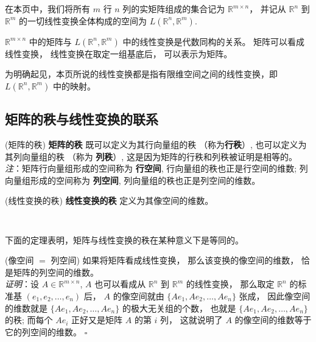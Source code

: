 

在本页中，我们将所有 $m$ 行 $n$ 列的实矩阵组成的集合记为 $\mathbb{R}^{m\times n}$， 并记从 $\mathbb{R}^{n}$ 到 $\mathbb{R}^{m}$ 的一切线性变换全体构成的空间为 $L(\mathbb{R}^{n},\mathbb{R}^{m}).$

$\mathbb{R}^{m\times n}$ 中的矩阵与 $L(\mathbb{R}^{n},\mathbb{R}^{m})$
中的线性变换是代数同构的关系。 矩阵可以看成线性变换， 线性变换在取定一组基底后， 可以表示为矩阵。 

为明确起见，本页所说的线性变换都是指有限维空间之间的线性变换，即 $L(\mathbb{R}^{n},\mathbb{R}^{m})$ 中的映射。

\subsection{矩阵的秩与线性变换的联系}

\begin{definition}{(矩阵的秩)}\label{def_linmat_2}
\textbf{矩阵的秩} 既可以定义为其行向量组的秩 （称为\textbf{行秩}）, 也可以定义为其列向量组的秩 （称为 \textbf{列秩}）,
这是因为矩阵的行秩和列秩被证明是相等的。 \\

\textsl{注}：矩阵行向量组形成的空间称为 \textbf{行空间}, 行向量组的秩也正是行空间的维数;
列向量组形成的空间称为 \textbf{列空间}, 列向量组的秩也正是列空间的维数。
\end{definition}



\begin{definition}{(线性变换的秩)}
\textbf{线性变换的秩} 定义为其像空间的维数。
\end{definition} 
\verb| |

下面的定理表明，矩阵与线性变换的秩在某种意义下是等同的。
\begin{theorem}{(像空间 $=$ 列空间)}\label{the_linmat_1}
 如果将矩阵看成线性变换， 那么该变换的像空间的维数， 恰是矩阵的列空间的维数。\\

\textsl{ 证明}：设 $A\in\mathbb{R}^{m\times n}$, $A$ 也可以看成从 $\mathbb{R}^{n}$ 到 $\mathbb{R}^{m}$
的线性变换， 那么取定 $\mathbb{R}^{n}$ 的标准基 $(e_{1},e_{2},\ldots,e_{n})$ 后，
$A$ 的像空间就由 $\{Ae_{1},Ae_{2},\ldots,Ae_{n}\}$ 张成， 因此像空间的维数就是 $\{Ae_{1},Ae_{2},\ldots,Ae_{n}\}$
的极大无关组的个数， 也就是 $\{Ae_{1},Ae_{2},\ldots,Ae_{n}\}$ 的秩; 而每个 $Ae_{i}$
正好又是矩阵 $A$ 的第 $i$ 列， 这就说明了 $A$ 的像空间的维数等于它的列空间的维数。 $\square$
\end{theorem}

